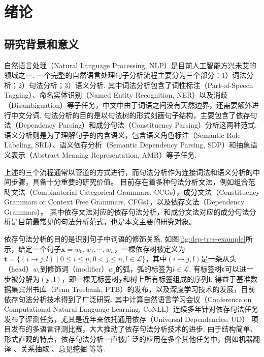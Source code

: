 \chapter{绪论}
\label{cha:intro}

\section{研究背景和意义}

自然语言处理（Natural Language Processing, NLP）是目前人工智能方兴未艾的领域之一.
一个完整的自然语言处理句子分析流程主要分为三个部分：1）词法分析；2）句法分析；3）语义分析\cite{zhang-2014-chinese-joint}.
其中词法分析包含了词性标注（Part-of-Speech Tagging）、命名实体识别（Named Entity Recognition, NER）以及消歧（Disambiguation）等子任务，中文中由于词语之间没有天然边界，还需要额外进行中文分词.
句法分析的目的是以句法树的形式刻画句子结构，主要包含了依存句法（Dependency Parsing）和成分句法（Constituency Parsing）分析这两种范式.
语义分析则是为了理解句子的内含语义，包含语义角色标注（Semantic Role Labeling, SRL）、语义依存分析（Semantic Dependency Parsing, SDP）和抽象语义表示（Abstract Meaning Representation, AMR）等子任务.

上述的三个流程通常以管道的方式进行，而句法分析作为连接词法和语义分析的中间步骤，具备十分重要的研究价值。
目前存在着多种句法分析文法，例如组合范畴文法（Combinatorial Categorical Grammars, CCGs），成分文法（Constituency Grammars or Context Free Grammars, CFGs），以及依存文法（Dependency Grammars）。
其中依存文法对应的依存句法分析，和成分文法对应的成分句法分析是目前最常见的句法分析范式，也是本文主要的研究对象。


依存句法分析的目的是识别句子中词语的修饰关系.
如图\ref{fig:dep-tree-example}所示，给定一个句子$\boldsymbol{x}=w_0,w_1,\cdots,w_n$，一棵依存树被定义为$\boldsymbol{t}=\{(i\rightarrow j,l)\mid 0\le i \le n,0 < j \le n,l \in \mathcal{L}\}$，其中$(i\rightarrow j,l)$是一条从头（head）$w_i$到修饰词（modifier）$w_j$的弧，弧的标签为$l \in \mathcal{L}$.
有标签树$\boldsymbol{t}$可以进一步被分解为$(\boldsymbol{y},\boldsymbol{l})$，即一棵无标签树$\boldsymbol{y}$和树上所有标签组成的序列$\boldsymbol{l}$.
得益于基准数据集宾州书库（Penn Treebank, PTB）的发布，以及深度学习技术的发展，目前依存句法分析技术得到了广泛研究\cite{li-2013-chinese-dep}.
其中计算自然语言学习会议（Conference on Computational Natural Language Learning, CoNLL）连续多年针对依存句法任务发布了评测任务，尤其是近年来依托通用依存（Universal Dependencies, UD） \citep{nivre-etal-2017-universal}项目发布的多语言评测比赛，大大推动了依存句法分析技术的进步.
由于结构简单、形式直观的特点，依存句法分析一直被广泛的应用在多个其他任务中，例如机器翻译 \citep{zhang-etal-2019-syntax}、关系抽取 \citep{song-etal-2019-leveraging}、意见挖掘 \citep{zhang-etal-2020-syntax}等等.

